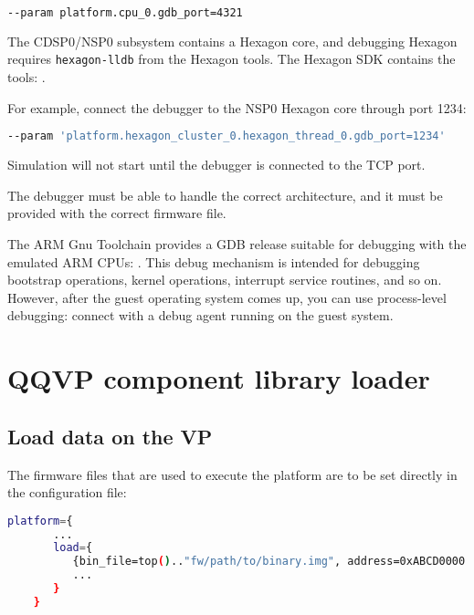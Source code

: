 \small
\begin{lstlisting}[language=bash]
    --param platform.cpu_0.gdb_port=4321
\end{lstlisting}
\normalsize

The CDSP0/NSP0 subsystem contains a Hexagon core, and debugging Hexagon
requires {\small{\lstinline!hexagon-lldb!}} from the Hexagon tools.  The Hexagon SDK
contains the tools: {}.

For example, connect the debugger to the NSP0 Hexagon core through port 1234:

\small
\begin{lstlisting}[language=bash]
    --param 'platform.hexagon_cluster_0.hexagon_thread_0.gdb_port=1234'
\end{lstlisting}
\normalsize

Simulation will not start until the debugger is connected to the TCP port.

\caution The debugger must be able to handle the correct architecture, and it must be provided with the correct firmware file.

The ARM Gnu Toolchain provides a GDB release suitable for debugging with the emulated ARM CPUs: {}. This debug mechanism is intended for debugging bootstrap operations, kernel operations, interrupt service routines, and so on. However, after the guest operating system comes up, you can use process-level debugging: connect with a debug agent running on the guest system.

\clearpage
\section{QQVP component library loader}

\subsection{Load data on the VP}
\label{sec:load-data-on-vp}

The firmware files that are used to execute the platform are to be set directly in the configuration file:

\small
\begin{lstlisting}[language=bash]
    platform={
       ...
       load={
          {bin_file=top().."fw/path/to/binary.img", address=0xABCD0000 };
          ...
       }
    }
\end{lstlisting}
\normalsize

